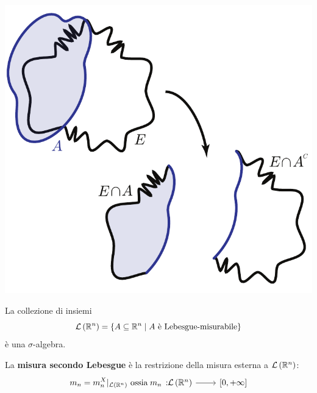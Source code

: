 	\begin{center}
		\includegraphics[trim=0cm 0cm 0cm 0cm, clip, scale=0.5]{images/criteriomisurabilita.pdf}
	\end{center}
	\begin{propositionqed}
		La collezione di insiemi
		\begin{equation*}
			\mathcal{L}\left(\mathbb{R}^n\right)=\left\{A\subseteq \mathbb{R}^n\mid A\text{ è Lebesgue-misurabile}\right\}
		\end{equation*}
		è una $\sigma$-algebra.
	\end{propositionqed}
	\begin{define}
		La \textbf{misura secondo Lebesgue} è la restrizione della misura esterna a $\mathcal{L}\left(\mathbb{R}^n\right)$:
		\begin{equation}
			m_n={m^X_n}\vert_{ \mathcal{L}\left(\realset^n\right)}\text{ ossia }\funz{m_n}{\mathcal{L}\left(\realset^n\right)}{\left[0,+\infty\right]}
		\end{equation}
	\end{define}
